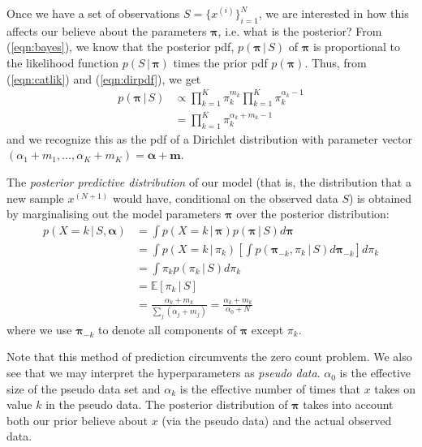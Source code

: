 \documentclass[final,3p,times,twocolumn]{elsarticle}
\let\bs\boldsymbol
\begin{document}
Once we have a set of observations $S = \{x^{(i)}\}_{i=1}^N$, we are interested in how this affects our believe about the parameters $\bs \pi$, i.e. what is the posterior?
From (\ref{eqn:bayes}), we know that the posterior pdf, $p(\bs \pi \,|\, S)$ of $\bs \pi$ is proportional to the likelihood function $p(S\,|\,\bs \pi)$ times the prior pdf $p(\bs \pi)$.
Thus, from (\ref{eqn:catlik}) and (\ref{eqn:dirpdf}), we get
\begin{equation}
\label{eqn:dirpost}
\begin{split}
p(\bs \pi \,|\, S) &\propto \prod\nolimits_{k=1}^K\pi_k^{m_k} \prod\nolimits_{k=1}^K \pi_k^{\alpha_k - 1}\\
	&= \prod\nolimits_{k=1}^K \pi_k^{\alpha_k+m_k-1}
\end{split}
\end{equation}
and we recognize this as the pdf of a Dirichlet distribution with parameter vector $(\alpha_1+m_1,\dots,\alpha_K+m_K) = \bs \alpha + \bs m$.

The \emph{posterior predictive distribution} of our model (that is, the distribution that a new sample $x^{(N+1)}$ would have, conditional on the observed data $S$) is obtained by marginalising out the model parameters $\bs \pi$ over the posterior distribution:
\begin{equation}
\begin{split}
p(X = k\,|\,S, \bs \alpha) &= \int p(X = k\,|\,\bs \pi)p(\bs \pi \,|\,S)d\bs\pi\\
&= \int p(X = k\,|\,\pi_k)\left[\int p(\bs \pi_{-k},\pi_k\,|\,S)d\bs\pi_{-k}\right]d\pi_k\\
&= \int \pi_k p(\pi_k\,|\,S)d\pi_k\\
&= \mathbb{E}\left[\pi_k\,|\,S\right]\\
&= \frac{\alpha_k + m_k}{\sum_j (\alpha_j+m_j)} = \frac{\alpha_k+m_k}{\alpha_0 + N}
\end{split}
\end{equation}
where we use $\bs \pi_{-k}$ to denote all components of $\bs \pi$ except $\pi_k$.

Note that this method of prediction circumvents the zero count problem.
We also see that we may interpret the hyperparameters as \emph{pseudo data}.
$\alpha_0$ is the effective size of the pseudo data set and $\alpha_k$ is the effective number of times that $x$ takes on value $k$ in the pseudo data.
The posterior distribution of $\bs \pi$ takes into account both our prior believe about $x$ (via the pseudo data) and the actual observed data.
\end{document}
